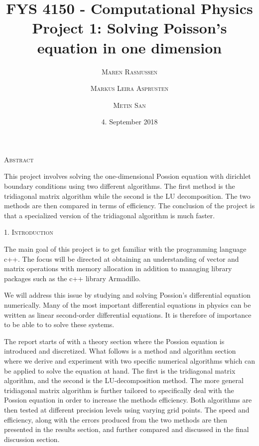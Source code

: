 \documentclass[a4paper,10pt]{article}
\title{FYS 4150 - Computational Physics\\
 Project 1: Solving Poisson's equation in one dimension 
}
\date{\normalsize{4. September 2018} }
\author{
 \textsc{\small{Maren Rasmussen}}\and \textsc{\small{Markus Leira Asprusten}}\and \textsc{\small{Metin San}}
 }
\begin{document}
\maketitle
\begin{center}
\textsc{Abstract}
\end{center}

\begin{adjustwidth}{7mm}{7mm}

This project involves solving the one-dimensional Possion equation with dirichlet boundary conditions using two different algorithms. The first method is the tridiagonal matrix algorithm while the second is the LU decomposition. The two methods are then compared in terms of efficiency. The conclusion of the project is that a specialized version of the tridiagonal algorithm is much faster.

\end{adjustwidth}



\bigskip

\begin{center}
\textsc{1. Introduction}
\end{center}
The main goal of this project is to get familiar with the programming language c++. The focus will be directed at obtaining an understanding of vector and matrix operations with memory allocation in addition to managing library packages such as the c++ library Armadillo. 

We will address this issue by studying and solving Possion's differential equation numerically. Many of the most important differential equations in physics can be written as linear second-order differential equations. It is therefore of importance to be able to to solve these systems. 

The report starts of with a theory section where the Possion equation is introduced and discretized.  What follows is a method and algorithm section where we derive and experiment with two specific numerical algorithms which can be applied to solve the equation at hand. The first is the tridiagonal matrix algorithm, and the second is the LU-decomposition method. The more general tridiagonal matrix algorithm is further tailored to specifically deal with the Possion equation in order to increase the methods efficiency. Both algorithms are then tested at different precision levels using varying grid points. The speed and efficiency, along with the errors produced from the two methods are then presented in the results section, and further compared and discussed in the final discussion section.
\end{document}

